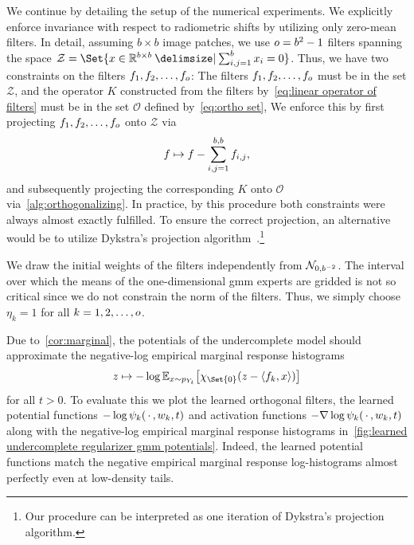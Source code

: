 We continue by detailing the setup of the numerical experiments.
We explicitly enforce invariance with respect to radiometric shifts by utilizing only zero-mean filters.
In detail, assuming \( b \times b \) image patches, we use \( o = b^{\num{2}} - \num{1} \) filters spanning the space \( \mathcal{Z} = \Set{x \in \R^{b \times b} \given \sum_{i, j=\num{1}}^b x_i = \num{0}} \).
Thus, we have two constraints on the filters \( f_{\num{1}}, f_{\num{2}}, \dotsc, f_o \):
The filters \( f_{\num{1}},f_{\num{2}},\dotsc,f_o \) must be in the set \( \mathcal{Z} \), and the operator \( K \) constructed from the filters by~\cref{eq:linear operator of filters} must be in the set \( \mathcal{O} \) defined by~\cref{eq:ortho set}, 
We enforce this by first projecting \( f_{\num{1}}, f_{\num{2}}, \dotsc, f_o \) onto \( \mathcal{Z} \) via
\begin{equation}
	f \mapsto f - \sum_{i,j=\num{1}}^{b,b} f_{i,j},
\end{equation}
and subsequently projecting the corresponding \( K \) onto \( \mathcal{O} \) via~\cref{alg:orthogonalizing}.
In practice, by this procedure both constraints were always almost exactly fulfilled.
To ensure the correct projection, an alternative would be to utilize Dykstra's projection algorithm~\cite{Boyle1986}.\footnote{
	Our procedure can be interpreted as one iteration of Dykstra's projection algorithm.
}

We draw the initial weights of the filters independently from \( \mathcal{N}_{\num{0}, b^{-2}} \).
The interval over which the means of the one-dimensional \gls{gmm} experts are gridded is not so critical since we do not constrain the norm of the filters.
Thus, we simply choose \( \eta_k = \num{1} \) for all \( k = \num{1}, \num{2}, \dotsc, o \).

Due to~\cref{cor:marginal}, the potentials of the undercomplete model should approximate the negative-log empirical marginal response histograms
\begin{equation}
	z \mapsto -\log \mathbb{E}_{x \sim p_{Y_t}} \bigl[ \CharacteristicFunction{\Set{\num{0}}}(z - \langle \Filter_k, x \rangle) \bigr]
\end{equation}
for all \( t > \num{0} \).
To evaluate this we plot the learned  orthogonal filters, the  learned potential functions \( -\log \psi_k(\,\cdot\,, w_k, t) \) and activation functions \( -\nabla \log \psi_k(\,\cdot\,, w_k, t) \) along with the negative-log empirical marginal response histograms in~\cref{fig:learned undercomplete regularizer gmm potentials}.
Indeed, the learned potential functions match the negative empirical marginal response log-histograms almost perfectly even at low-density tails.

